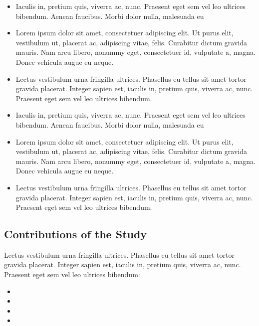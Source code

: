 \documentclass{article}
\begin{document}
\begin{itemize}
    \item Iaculis in, pretium quis, viverra ac, nunc. Praesent eget sem vel leo ultrices bibendum. Aenean faucibus. Morbi dolor nulla, malesuada eu

    \item Lorem ipsum dolor sit amet, consectetuer adipiscing elit. Ut purus elit, vestibulum ut, placerat ac,
    adipiscing vitae, felis. Curabitur dictum gravida mauris. Nam arcu libero, nonummy eget, consectetuer id, vulputate a, magna. Donec vehicula augue eu neque.

    \item Lectus vestibulum urna fringilla ultrices. Phasellus eu tellus sit amet tortor gravida placerat. Integer
    sapien est, iaculis in, pretium quis, viverra ac, nunc. Praesent eget sem vel leo ultrices bibendum.

    \item Iaculis in, pretium quis, viverra ac, nunc. Praesent eget sem vel leo ultrices bibendum. Aenean faucibus. Morbi dolor nulla, malesuada eu

    \item Lorem ipsum dolor sit amet, consectetuer adipiscing elit. Ut purus elit, vestibulum ut, placerat ac,
    adipiscing vitae, felis. Curabitur dictum gravida mauris. Nam arcu libero, nonummy eget, consectetuer id, vulputate a, magna. Donec vehicula augue eu neque.

    \item Lectus vestibulum urna fringilla ultrices. Phasellus eu tellus sit amet tortor gravida placerat. Integer
    sapien est, iaculis in, pretium quis, viverra ac, nunc. Praesent eget sem vel leo ultrices bibendum.

\end{itemize}



\subsection{Contributions of the Study}
Lectus vestibulum urna fringilla ultrices. Phasellus eu tellus sit amet tortor gravida placerat. Integer sapien est, iaculis in, pretium quis, viverra ac, nunc. Praesent eget sem vel leo ultrices bibendum:

\begin{itemize}

    \item \lipsum[10]

    \item \lipsum[12] 

    \item \lipsum[14]

    \item \lipsum[16] 
    
\end{itemize}
\end{document}
